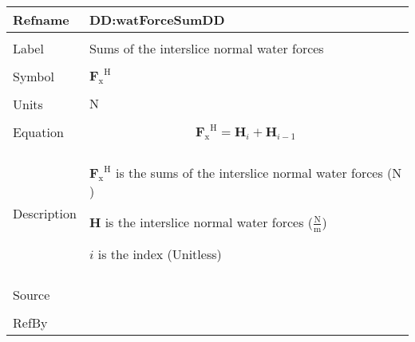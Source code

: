 \documentclass[12pt]{article}
\begin{document}
\vspace{\baselineskip}
\noindent
\begin{minipage}{\textwidth}
\begin{tabular}{>{\raggedright}p{}>{\raggedright\arraybackslash}p{}}
\toprule \textbf{Refname} & \textbf{DD:watForceSumDD}
\label{DD:watForceSumDD}
\\ \midrule \\
Label & Sums of the interslice normal water forces
        
\\ \midrule \\
Symbol & ${{\symbf{F}_{\text{x}}}^{\text{H}}}$
         
\\ \midrule \\
Units & ${\text{N}}$
        
\\ \midrule \\
Equation & \begin{displaymath}
           {{\symbf{F}_{\text{x}}}^{\text{H}}}={\symbf{H}}_{i}+{\symbf{H}}_{i-1}
           \end{displaymath}
\\ \midrule \\
Description & \begin{symbDescription}
              \item{${{\symbf{F}_{\text{x}}}^{\text{H}}}$ is the sums of the interslice normal water forces (${\text{N}}$)}
              \item{$\symbf{H}$ is the interslice normal water forces ($\frac{\text{N}}{\text{m}}$)}
              \item{$i$ is the index (Unitless)}
              \end{symbDescription}
\\ \midrule \\
Source & \cite{fredlund1977}
         
\\ \midrule \\
RefBy & 
\\ \bottomrule
\end{tabular}
\end{minipage}
\end{document}
